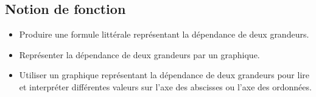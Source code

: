 \documentclass[a4paper,12pt,fleqn]{article}	
\begin{document}
\subsection*{Notion de fonction}

\begin{itemize}
	\item {}Produire une formule littérale représentant la dépendance de deux grandeurs.
	\item {}Représenter la dépendance de deux grandeurs par un graphique.
	\item {}Utiliser un graphique représentant la dépendance de deux grandeurs pour lire et interpréter différentes valeurs sur l’axe des abscisses ou l’axe des ordonnées.
\end{itemize}
	
\end{document}
